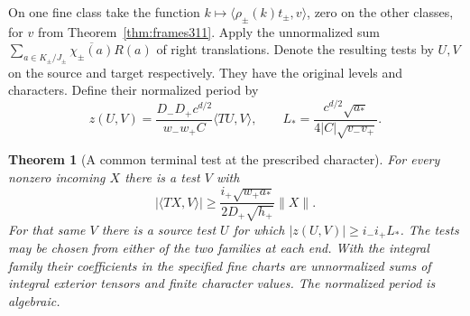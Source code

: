 \documentclass[a4paper,11pt]{article}
\newtheorem{theorem}[proposition]{Theorem}
\theoremstyle{definition}
\theoremstyle{remark}
\numberwithin{equation}{section}
\begin{document}
On one fine class take the function
\(k\mapsto\langle\rho_\pm(k)t_\pm,v\rangle\), zero on the
other classes, for \(v\) from Theorem~\ref{thm:frames311}.
Apply the unnormalized sum
\(\sum_{a\in K_\pm/J_\pm}\overline{\chi_\pm(a)}R(a)\)
of right translations. Denote the resulting tests by \(U,V\)
on the source and target respectively. They have the original
levels and characters. Define their normalized period by
\[
 z(U,V)=\frac{D_-D_+c^{d/2}}{w_-w_+ C}\langle TU,V\rangle,
 \qquad L_*=\frac{c^{d/2}\sqrt{a_*}}{4|C|\sqrt{v_-v_+}} .
\]

\begin{theorem}[A common terminal test at the prescribed character]\leavevmode
\label{thm:lastrow311}
For every nonzero incoming \(X\) there is a test \(V\) with
\[
 |\langle TX,V\rangle|
       \ge \frac{i_+\sqrt{w_+a_*}}{2D_+\sqrt{h_+}}\|X\|.
\]
For that same \(V\) there is a source test \(U\) for which
\(|z(U,V)|\ge i_- i_+ L_*\). The tests may be chosen from
either of the two families at each end. With the integral
family their coefficients in the specified fine charts are
unnormalized sums of integral exterior tensors and finite
character values. The normalized period is algebraic.
\end{theorem}
\end{document}
